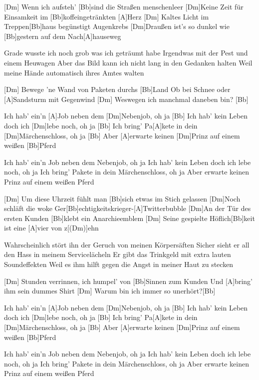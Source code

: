 

\hspace*{-7em}

\begin{guitar}
	[Dm] Wenn ich aufsteh' [Bb]sind die Straßen menschenleer
	[Dm]Keine Zeit für Einsamkeit im [Bb]koffeingetränkten [A]Herz
	[Dm] Kaltes Licht im Treppen[Bb]haus begünstigt Augenkrebs
	[Dm]Draußen ist's so dunkel wie [Bb]gestern auf dem Nach[A]hauseweg
	
	Grade wusste ich noch grob was ich geträumt habe
	Irgendwas mit der Pest und einem Heuwagen
	Aber das Bild kann ich nicht lang in den Gedanken halten
	Weil meine Hände automatisch ihres Amtes walten
	
	[Dm] Bewege 'ne Wand von Paketen durchs [Bb]Land
	Ob bei Schnee oder [A]Sandsturm mit Gegenwind
	[Dm] Weswegen ich manchmal daneben bin? [Bb]{}
	
	\begin{highlightbar}
		Ich hab' ein'n [A]Job neben dem [Dm]Nebenjob, oh ja [Bb]{}
		Ich hab' kein Leben doch ich [Dm]lebe noch, oh ja [Bb]{}
		Ich bring' Pa[A]kete in dein [Dm]Märchenschloss, oh ja [Bb]{}
		Aber [A]erwarte keinen [Dm]Prinz auf einem weißen [Bb]Pferd
		
		Ich hab' ein'n Job neben dem Nebenjob, oh ja
		Ich hab' kein Leben doch ich lebe noch, oh ja
		Ich bring' Pakete in dein Märchenschloss, oh ja
		Aber erwarte keinen Prinz auf einem weißen Pferd
	\end{highlightbar}
	\pagebreak
	\songsection{Strophe 2}
	[Dm] Um diese Uhrzeit fühlt man [Bb]sich etwas im Stich gelassen
	[Dm]Noch schläft die woke Ger[Bb]echtigkeitskrieger-[A]Twitterbubble
	[Dm]An der Tür des ersten Kunden [Bb]klebt ein Anarchieemblem
	[Dm] Seine gespielte Höflich[Bb]keit ist eine [A]vier von z[(Dm)]ehn
	
	Wahrscheinlich stört ihn der Geruch von meinen Körpersäften
	Sicher sieht er all den Hass in meinem Servicelächeln
	Er gibt das Trinkgeld mit extra lauten Soundeffekten
	Weil es ihm hilft gegen die Angst in meiner Haut zu stecken
	
	\songsection{Vorrefrain}
	[Dm] Stunden verrinnen, ich humpel' von [Bb]Sinnen zum Kunden
	Und [A]bring' ihm sein dummes Shirt
	[Dm] Warum bin ich immer so unerhört?[Bb]{}
	
	\begin{highlightbar}
		\songsection{Refrain}
		Ich hab' ein'n [A]Job neben dem [Dm]Nebenjob, oh ja [Bb]{}
		Ich hab' kein Leben doch ich [Dm]lebe noch, oh ja [Bb]{}
		Ich bring' Pa[A]kete in dein [Dm]Märchenschloss, oh ja [Bb]{}
		Aber [A]erwarte keinen [Dm]Prinz auf einem weißen [Bb]Pferd
		
		Ich hab' ein'n Job neben dem Nebenjob, oh ja
		Ich hab' kein Leben doch ich lebe noch, oh ja
		Ich bring' Pakete in dein Märchenschloss, oh ja
		Aber erwarte keinen Prinz auf einem weißen Pferd
	\end{highlightbar}
\end{guitar}